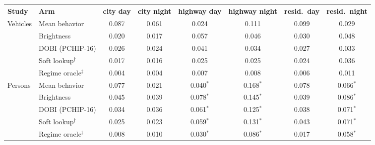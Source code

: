 \begin{tabular}{llcccccc}
\toprule
Study & Arm & city day & city night & highway day & highway night & resid.\ day & resid.\ night \\
\midrule
Vehicles & Mean behavior & 0.087 & 0.061 & 0.024 & 0.111 & 0.099 & 0.029 \\
 & Brightness & 0.020 & 0.017 & 0.057 & 0.046 & 0.030 & 0.048 \\
 & DOBI (PCHIP-16) & 0.026 & 0.024 & 0.041 & 0.034 & 0.027 & 0.033 \\
 & Soft lookup$^\dagger$ & 0.017 & 0.016 & 0.025 & 0.025 & 0.024 & 0.036 \\
 & Regime oracle$^\ddagger$ & 0.004 & 0.004 & 0.007 & 0.008 & 0.006 & 0.011 \\
\midrule
Persons & Mean behavior & 0.077 & 0.021 & 0.040$^\ast$ & 0.168$^\ast$ & 0.078 & 0.066$^\ast$ \\
 & Brightness & 0.045 & 0.039 & 0.078$^\ast$ & 0.145$^\ast$ & 0.039 & 0.086$^\ast$ \\
 & DOBI (PCHIP-16) & 0.034 & 0.036 & 0.061$^\ast$ & 0.125$^\ast$ & 0.038 & 0.071$^\ast$ \\
 & Soft lookup$^\dagger$ & 0.025 & 0.023 & 0.059$^\ast$ & 0.131$^\ast$ & 0.043 & 0.071$^\ast$ \\
 & Regime oracle$^\ddagger$ & 0.008 & 0.010 & 0.030$^\ast$ & 0.086$^\ast$ & 0.017 & 0.058$^\ast$ \\
\bottomrule
\end{tabular}
